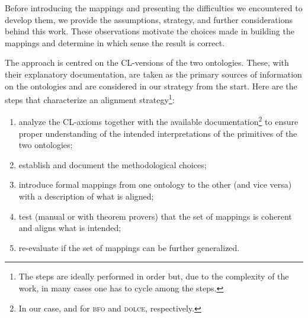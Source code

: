 \documentclass[ao]{iosart2x}
\newcommand{\nb}[1]{\textcolor{red}{$|$}\marginpar{\hspace*{-0cm}\parbox{20mm}{\scriptsize\raggedright\textcolor{red}{#1}}}}
\newcommand{\dolce}{{\textsc{dolce}}}
\newcommand{\bfo}{{\textsc{bfo}}}
\begin{document}
Before introducing the mappings and presenting the difficulties we encountered to develop them, we provide the assumptions, strategy, and further considerations behind this work. These observations motivate the choices made in building the mappings and determine in which sense the result is correct.

The approach is centred on the CL-versions of the two ontologies. These, with their explanatory documentation, are taken as the primary sources of information on the ontologies and are considered in our strategy from the start. 
Here are the steps that characterize an alignment strategy\footnote{The steps are ideally performed in order but, due to the complexity of the work, in many cases one has to cycle among the steps.}:
\begin{enumerate}[({\bf S}1)]
\item analyze the CL-axioms together with the available documentation\footnote{In our case, \citep{barryBasicFormalOntology2015} and \citep{D18} for {\bfo} and {\dolce}, respectively.} %
to ensure proper understanding of the intended interpretations of the primitives of the two ontologies; %
 \item establish and document the methodological choices;
\item introduce formal mappings from one ontology to the other (and vice versa) with a description of what is aligned;
\item test (manual or with theorem provers) that the set of mappings is coherent and aligns what is intended;
\item re-evaluate if the set of mappings can be further generalized.
\end{enumerate}
\end{document}
